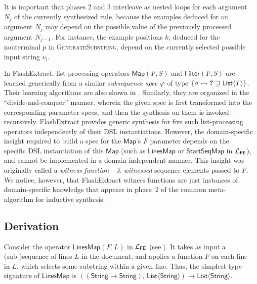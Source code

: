 It is important that phases 2 and 3 interleave as nested loops for each argument $N_j$ of the currently synthesized
rule, because the examples deduced for an argument $N_{j}$ may depend on the possible value of the
previously processed argument $N_{j-1}$.
For instance, the example positions $k$, deduced for the nonterminal $p$ in \textsc{GenerateSubstring}, depend on the
currently selected possible input string $v_i$.

In FlashExtract, list processing operators $\mathsf{Map}(F, S)$ and $\mathsf{Filter}(F, S)$ are learned generically from
a similar \emph{subsequence spec} $\varphi$ of type $\{ \sigma \rightsquigarrow \textbf{?} \sqsupseteq
\mathsf{List}\langle T\rangle \}$.
Their learning algorithms are also shown in .
Similarly, they are organized in the ``divide-and-conquer'' manner, wherein the given spec is first transformed
into the corresponding parameter specs, and then the synthesis on them is invoked recursively.
FlashExtract provides generic synthesis for five such list\hyp{}processing operators independently of their DSL
instantiations.
However, the domain-specific insight required to build a spec for the $\mathsf{Map}$'s $F$ parameter depends on
the specific DSL instantiation of this $\mathsf{Map}$ (such as $\mathsf{LinesMap}$ or $\mathsf{StartSeqMap}$ in
$\mathcal{L}_{\mathsf{FE}}$), and cannot be implemented in a domain-independent manner.
This insight was originally called a \emph{witness function} -- it \emph{witnessed} sequence elements passed to $F$.
We notice, however, that FlashExtract witness functions are just instances of domain-specific knowledge that
appears in phase~2 of the common meta-algorithm for inductive synthesis.

\subsection{Derivation}
Consider the operator $\mathsf{LinesMap}(F, L)$ in $\mathcal{L}_{\mathsf{FE}}$ (see ).
It takes as input a \mbox{(sub-)sequence} of lines $L$ in the document, and applies a function $F$ on each line in $L$,
which selects some substring within a given line.
Thus, the simplest type signature of $\mathsf{LinesMap}$ is \mbox{$\left((\mathsf{String} \!\to\!
\mathsf{String}),\, \mathsf{List}\langle\mathsf{String}\rangle\right) \to \mathsf{List}\langle \mathsf{String}
    \rangle$}.

